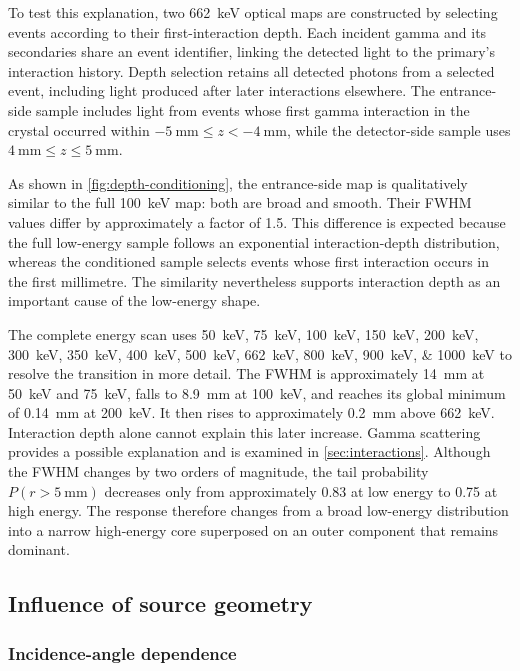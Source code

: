 To test this explanation, two \qty{662}{\kilo\electronvolt} optical maps are constructed by selecting events according to their first-interaction depth. Each incident gamma and its secondaries share an event identifier, linking the detected light to the primary's interaction history. Depth selection retains all detected photons from a selected event, including light produced after later interactions elsewhere.
The entrance-side sample includes light from events whose first gamma interaction in the crystal occurred within $\qty{-5}{\milli\metre}\leq z<\qty{-4}{\milli\metre}$, while the detector-side sample uses $\qty{4}{\milli\metre}\leq z\leq\qty{5}{\milli\metre}$.


As shown in \cref{fig:depth-conditioning}, the entrance-side map is qualitatively similar to the full \qty{100}{\kilo\electronvolt} map: both are broad and smooth. Their FWHM values differ by approximately a factor of 1.5. This difference is expected because the full low-energy sample follows an exponential interaction-depth distribution, whereas the conditioned sample selects events whose first interaction occurs in the first millimetre. The similarity nevertheless supports interaction depth as an important cause of the low-energy shape.

The complete energy scan uses \qtylist{50;75;100;150;200;300;350;400;500;662;800;900;1000}{\kilo\electronvolt} to resolve the transition in more detail. The FWHM is approximately \qty{14}{\milli\metre} at \qty{50}{\kilo\electronvolt} and \qty{75}{\kilo\electronvolt}, falls to \qty{8.9}{\milli\metre} at \qty{100}{\kilo\electronvolt}, and reaches its global minimum of \qty{0.14}{\milli\metre} at \qty{200}{\kilo\electronvolt}. It then rises to approximately \qty{0.2}{\milli\metre} above \qty{662}{\kilo\electronvolt}. Interaction depth alone cannot explain this later increase. Gamma scattering provides a possible explanation and is examined in \cref{sec:interactions}. Although the FWHM changes by two orders of magnitude, the tail probability $P(r>\qty{5}{\milli\metre})$ decreases only from approximately 0.83 at low energy to 0.75 at high energy. The response therefore changes from a broad low-energy distribution into a narrow high-energy core superposed on an outer component that remains dominant.

\subsection{Influence of source geometry}
\subsubsection{Incidence-angle dependence}

